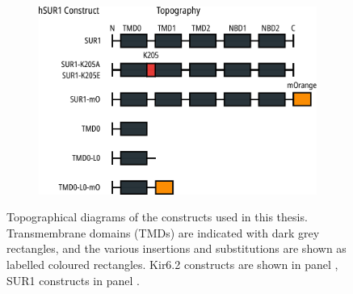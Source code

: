 \begin{figure}[h]
\begin{subfigure}[t]{0.45\textwidth}
		\includegraphics[width=\textwidth]{sur_constructs.pdf}
	\end{subfigure}
	\caption[hKir6.2 and hSUR1 constructs and their abbreviations]{
	Topographical diagrams of the constructs used in this thesis.
	Transmembrane domains (TMDs) are indicated with dark grey rectangles, and the various insertions and substitutions are shown as labelled coloured rectangles.
	Kir6.2 constructs are shown in panel , SUR1 constructs in panel .
	}\label{ch0fig:constructs}
\end{figure}